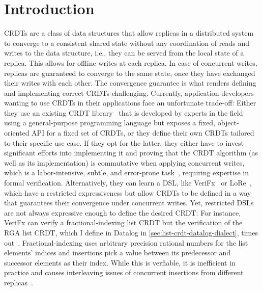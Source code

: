 
\chapter{Introduction}\label{ch:intro}

\acp{CRDT} are a class of data structures that allow replicas in a distributed
system to converge to a consistent shared state without any coordination
of reads and writes to the data structure, i.e., they can be served from the
local state of a replica.
This allows for offline writes at each replica.
In case of concurrent writes, replicas are guaranteed to converge to the same state,
once they have exchanged their writes with each other.
The convergence guarantee is what renders defining and implementing
correct \acp{CRDT} challenging.
Currently, application developers wanting to use \acp{CRDT} in their applications
face an unfortunate trade-off:
Either they use an existing \ac{CRDT} library~\cite{automerge,yjs,lore}
that is developed by experts in the field using a general-purpose programming language
but exposes a fixed, object-oriented \acs{API} for a fixed set of \acp{CRDT},
or they define their own \acp{CRDT} tailored to their specific use case.
If they opt for the latter, they either have to invest significant efforts
into implementing it and proving that the \ac{CRDT} algorithm
(as well as its implementation) is commutative when applying concurrent writes,
which is a labor-intensive, subtle, and error-prone
task~\cite{gomes2017verifying,kleppmann2022assessing},
requiring expertise in formal verification.
Alternatively, they can learn a \ac{DSL}, like VeriFx~\cite{verifx}
or LoRe~\cite{lore}, which have a restricted expressiveness but allow
\acp{CRDT} to be defined in a way that guarantees their convergence under
concurrent writes.
Yet, restricted \acp{DSL} are not always expressive enough
to define the desired \ac{CRDT}:
For instance, VeriFx can verify a fractional-indexing list \ac{CRDT}
but the verification of the RGA list \ac{CRDT}, which I define in Datalog in
\ref{sec:list-crdt-datalog-dialect}, times out~\cite{verifx}.
Fractional-indexing uses arbitrary precision rational numbers for the list
elements' indices and insertions pick a value between its predecessor and
successor elements as their index.
While this is verfiable, it is inefficient in practice and causes
interleaving issues of concurrent insertions from different replicas~\cite{fugue}.

